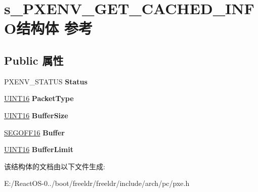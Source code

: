 \hypertarget{structs___p_x_e_n_v___g_e_t___c_a_c_h_e_d___i_n_f_o}{}\section{s\+\_\+\+P\+X\+E\+N\+V\+\_\+\+G\+E\+T\+\_\+\+C\+A\+C\+H\+E\+D\+\_\+\+I\+N\+F\+O结构体 参考}
\label{structs___p_x_e_n_v___g_e_t___c_a_c_h_e_d___i_n_f_o}
\subsection*{Public 属性}
\begin{DoxyCompactItemize}
\item 
\mbox{\label{structs___p_x_e_n_v___g_e_t___c_a_c_h_e_d___i_n_f_o_afaa1010448f1f05b96b4e35c8471976e}} 
P\+X\+E\+N\+V\+\_\+\+S\+T\+A\+T\+US {\bfseries Status}
\item 
\mbox{\label{structs___p_x_e_n_v___g_e_t___c_a_c_h_e_d___i_n_f_o_aaecc0ff3dea28a47af36653d8b21306e}} 
\hyperlink{_processor_bind_8h_a09f1a1fb2293e33483cc8d44aefb1eb1}{U\+I\+N\+T16} {\bfseries Packet\+Type}
\item 
\mbox{\label{structs___p_x_e_n_v___g_e_t___c_a_c_h_e_d___i_n_f_o_afba756d19677c564738ec03b0656c7f8}} 
\hyperlink{_processor_bind_8h_a09f1a1fb2293e33483cc8d44aefb1eb1}{U\+I\+N\+T16} {\bfseries Buffer\+Size}
\item 
\mbox{\label{structs___p_x_e_n_v___g_e_t___c_a_c_h_e_d___i_n_f_o_a2c3c3c3b03ec29e255a82b5b37f79758}} 
\hyperlink{structs___s_e_g_o_f_f16}{S\+E\+G\+O\+F\+F16} {\bfseries Buffer}
\item 
\mbox{\label{structs___p_x_e_n_v___g_e_t___c_a_c_h_e_d___i_n_f_o_a2953f8343fd277b2e6d1614943816db3}} 
\hyperlink{_processor_bind_8h_a09f1a1fb2293e33483cc8d44aefb1eb1}{U\+I\+N\+T16} {\bfseries Buffer\+Limit}
\end{DoxyCompactItemize}


该结构体的文档由以下文件生成\+:\begin{DoxyCompactItemize}
\item 
E\+:/\+React\+O\+S-\/0../boot/freeldr/freeldr/include/arch/pc/pxe.\+h\end{DoxyCompactItemize}
